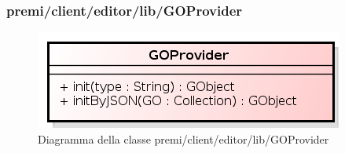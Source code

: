 \subsubsection{premi/client/editor/lib/GOProvider}
\begin{figure}[h]
\begin{center}
\includegraphics[scale=0.40]{img/diacla/GOProvider.png}
\caption{Diagramma della classe premi/client/editor/lib/GOProvider}
\end{center}
\end{figure}

